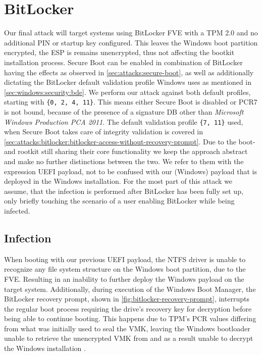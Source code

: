 \section{BitLocker}

Our final attack will target systems using BitLocker \ac{FVE} with a \ac{TPM} 2.0 and no additional PIN or startup key configured.
This leaves the Windows boot partition encrypted, the \ac{ESP} is remains unencrypted, thus not affecting the bootkit installation process.
Secure Boot can be enabled in combination of BitLocker having the effects as observed in \autoref{sec:attacks:secure-boot}, as well as additionally dictating the BitLocker default validation profile Windows uses as mentioned in \autoref{sec:windows:security:bde}.
We perform our attack against both default profiles, starting with \lstinline|{0, 2, 4, 11}|.
This means either Secure Boot is disabled or \ac{PCR}7 is not bound, because of the presence of a signature \ac{DB} other than \emph{Microsoft Windows Production PCA 2011}.
The default validation profile \lstinline|{7, 11}| used, when Secure Boot takes care of integrity validation is covered in \autoref{sec:attacks:bitlocker:bitlocker-access-without-recovery-prompt}.
Due to the boot- and rootkit still sharing their core functionality we keep the approach abstract and make no further distinctions between the two.
We refer to them with the expression \ac{UEFI} payload, not to be confused with our (Windows) payload that is deployed in the Windows installation.
For the most part of this attack we assume, that the infection is performed after BitLocker has been fully set up, only briefly touching the scenario of a user enabling BitLocker while being infected.


\subsection{Infection}

When booting with our previous \ac{UEFI} payload, the \ac{NTFS} driver is unable to recognize any file system structure  on the Windows boot partition, due to the \ac{FVE}.
Resulting in an inability to further deploy the Windows payload on the target system.
Additionally, during execution of the Windows Boot Manager, the BitLocker recovery prompt, shown in \autoref{fig:bitlocker-recovery-prompt}, interrupts the regular boot process requiring the drive's recovery key for decryption before being able to continue booting.
This happens due to \ac{TPM}'s \ac{PCR} values differing from what was initially used to seal the \ac{VMK}, leaving the Windows bootloader unable to retrieve the unencrypted \ac{VMK} from and as a result unable to decrypt the Windows installation \cite[Section 12]{windows-internals-7-part2}.

